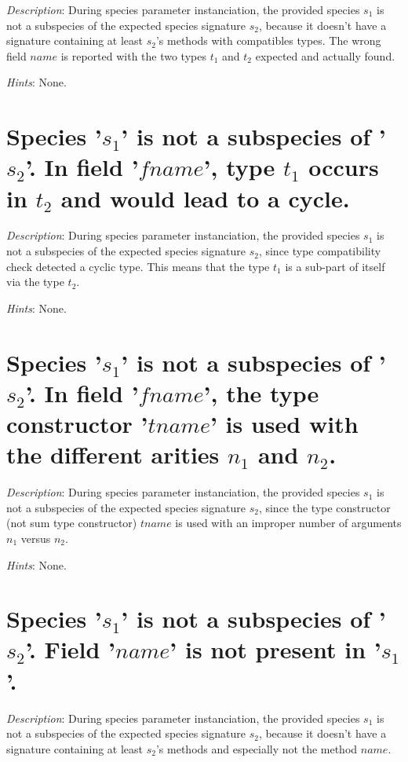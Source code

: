 {\em Description}: During species parameter instanciation, the
provided species $s_1$ is not a subspecies of the expected species
signature $s_2$, because it doesn't have a signature containing at
least $s_2$'s methods with compatibles types. The wrong field $name$
is reported with the two types $t_1$ and $t_2$ expected and actually
found.

{\em Hints}: None.



\section*{Species '$s_1$' is not a subspecies of '$s_2$'. In field
  '$fname$', type $t_1$ occurs in $t_2$ and would lead to a cycle.}

{\em Description}: During species parameter instanciation, the
provided species $s_1$ is not a subspecies of the expected species
signature $s_2$, since type compatibility check detected a cyclic
type. This means that the type $t_1$ is a sub-part of itself via the
type $t_2$.

{\em Hints}: None.



\section*{Species '$s_1$' is not a subspecies of '$s_2$'. In field
  '$fname$', the type constructor '$tname$' is used with the different
  arities $n_1$ and $n_2$.}

{\em Description}: During species parameter instanciation, the
provided species $s_1$ is not a subspecies of the expected species
signature $s_2$, since the type constructor (not sum type constructor)
$tname$ is used with an improper number of arguments $n_1$ versus
$n_2$.

{\em Hints}: None.



\section*{Species '$s_1$' is not a subspecies of '$s_2$'. Field '$name$'
  is not present in '$s_1$'.}

{\em Description}: During species parameter instanciation, the
provided species $s_1$ is not a subspecies of the expected species
signature $s_2$, because it doesn't have a signature containing at
least $s_2$'s methods and especially not the method $name$.

